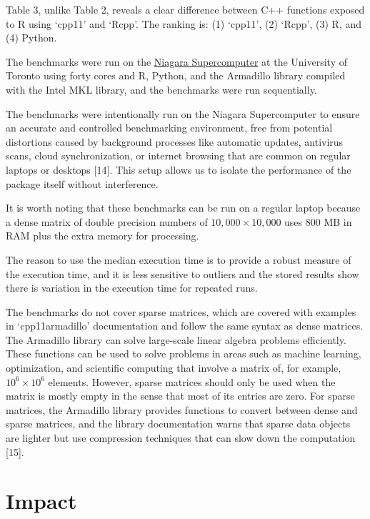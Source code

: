 \documentclass[preprint,12pt, a4paper]{elsarticle}
\begin{document}
Table 3, unlike Table 2, reveals a clear difference between C++
functions exposed to R using `cpp11' and `Rcpp'. The ranking is: (1)
`cpp11', (2) `Rcpp', (3) R, and (4) Python.

The benchmarks were run on the
\href{https://docs.scinet.utoronto.ca/index.php/Niagara_Quickstart}{Niagara
Supercomputer} at the University of Toronto using forty cores and R,
Python, and the Armadillo library compiled with the Intel MKL library,
and the benchmarks were run sequentially.

The benchmarks were intentionally run on the Niagara Supercomputer to
ensure an accurate and controlled benchmarking environment, free from
potential distortions caused by background processes like automatic
updates, antivirus scans, cloud synchronization, or internet browsing
that are common on regular laptops or desktops {[}14{]}. This setup
allows us to isolate the performance of the package itself without
interference.

It is worth noting that these benchmarks can be run on a regular laptop
because a dense matrix of double precision numbers of
\(10,000 \times 10,000\) uses 800 MB in RAM plus the extra memory for
processing.

The reason to use the median execution time is to provide a robust
measure of the execution time, and it is less sensitive to outliers and
the stored results show there is variation in the execution time for
repeated runs.

The benchmarks do not cover sparse matrices, which are covered with
examples in `cpp11armadillo' documentation and follow the same syntax as
dense matrices. The Armadillo library can solve large-scale linear
algebra problems efficiently. These functions can be used to solve
problems in areas such as machine learning, optimization, and scientific
computing that involve a matrix of, for example, \(10^6 \times 10^6\)
elements. However, sparse matrices should only be used when the matrix
is mostly empty in the sense that most of its entries are zero. For
sparse matrices, the Armadillo library provides functions to convert
between dense and sparse matrices, and the library documentation warns
that sparse data objects are lighter but use compression techniques that
can slow down the computation {[}15{]}.

\section{Impact}\label{impact}
\end{document}

